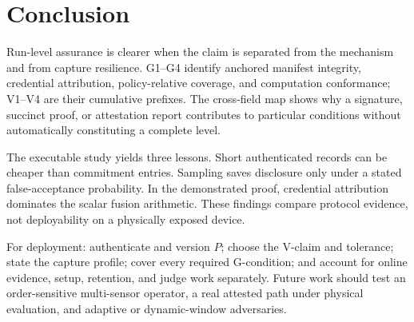 \section{Conclusion}
\label{sec:conclusion}

Run-level assurance is clearer when the claim is separated from the mechanism
and from capture resilience. G1--G4 identify anchored manifest integrity,
credential attribution, policy-relative coverage, and computation conformance;
V1--V4 are their cumulative prefixes. The cross-field map shows why a
signature, succinct proof, or attestation report contributes to particular
conditions without automatically constituting a complete level.

The executable study yields three lessons. Short authenticated records can be
cheaper than commitment entries. Sampling saves disclosure only under a stated
false-acceptance probability. In the demonstrated proof, credential attribution
dominates the scalar fusion arithmetic. These findings compare protocol
evidence, not deployability on a physically exposed device.

For deployment: authenticate and version $P$; choose the V-claim and tolerance;
state the capture profile; cover every required G-condition; and account for
online evidence, setup, retention, and judge work separately. Future work
should test an order-sensitive multi-sensor operator, a real attested path under
physical evaluation, and adaptive or dynamic-window adversaries.
